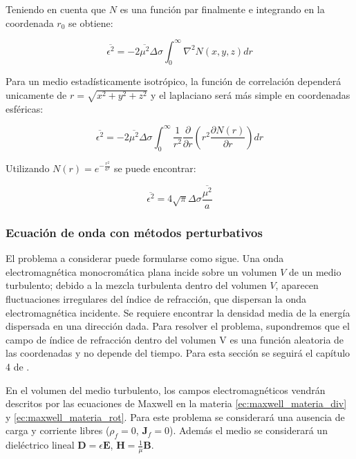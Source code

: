 Teniendo en cuenta que $N$ es una función par finalmente e integrando en la coordenada $r_0$ se obtiene:

\begin{equation}
    \overline{\epsilon^2} = -2\overline{\mu^2}\Delta \sigma \int_0^{\infty}\nabla^2N(x, y, z)dr
\end{equation}

Para un medio estadísticamente isotrópico, la función de correlación dependerá unicamente de $r =\sqrt{x^2+y^2+z^2}$ y el laplaciano será más simple en coordenadas esféricas:

\begin{equation}
    \overline{\epsilon^2} = -2\overline{\mu^2}{\Delta \sigma}\int_0^{\infty}\frac{1}{r^2}\frac{\partial}{\partial r} \left( r^2\frac{\partial N(r)}{\partial r}\right) dr
\end{equation}

Utilizando $N(r) = e^{-\frac{r^2}{a^2}}$ se puede encontrar:

\begin{equation}
    \overline{\epsilon^2} = 4 \sqrt{\pi} \Delta \sigma \frac{\overline{\mu^2}}{a}
\end{equation}

\subsubsection{Ecuación de onda con métodos perturbativos}

El problema a considerar puede formularse como sigue. Una onda electromagnética monocromática plana incide sobre un volumen $V$ de un medio turbulento; debido a la mezcla turbulenta dentro del volumen $V$, aparecen fluctuaciones irregulares del índice de refracción, que dispersan la onda electromagnética incidente. Se requiere encontrar la densidad media de la energía dispersada en una dirección dada. Para resolver el problema, supondremos que el campo de índice de refracción dentro del volumen V es una función aleatoria de las coordenadas y no depende del tiempo. Para esta sección se seguirá el capítulo 4 de \cite{tatarski_wave_1967}.

En el volumen del medio turbulento, los campos electromagnéticos vendrán descritos por las ecuaciones de Maxwell en la materia \ref{ec:maxwell_materia_div} y \ref{ec:maxwell_materia_rot}. Para este problema se considerará una ausencia de carga y corriente libres ($\rho_f = 0$, $\mathbf{J}_f = 0$). Además el medio se considerará un dieléctrico lineal $\mathbf{D} = \epsilon \mathbf{E}$, $\mathbf{H} = \frac{1}{\mu}\mathbf{B}$.

